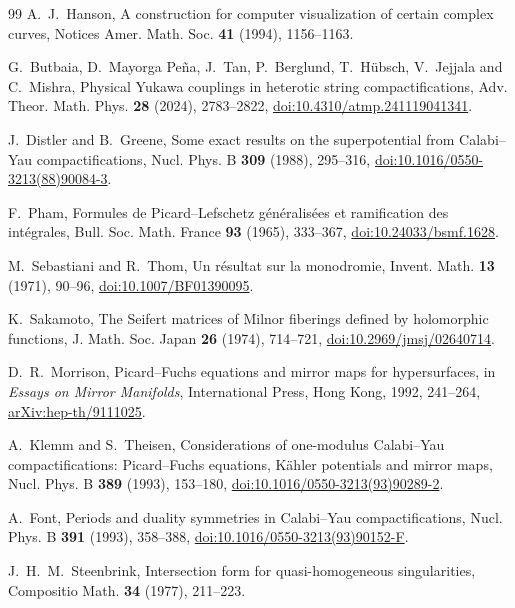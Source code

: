 \begin{thebibliography}{99}
A.~J.~Hanson, A construction for computer visualization of certain complex
curves, Notices Amer. Math. Soc. \textbf{41} (1994), 1156--1163.

G.~Butbaia, D.~Mayorga Pe\~na, J.~Tan, P.~Berglund, T.~H\"ubsch, V.~Jejjala
and C.~Mishra, Physical Yukawa couplings in heterotic string
compactifications, Adv. Theor. Math. Phys. \textbf{28} (2024), 2783--2822,
\href{https://doi.org/10.4310/atmp.241119041341}{doi:10.4310/atmp.241119041341}.

J.~Distler and B.~Greene, Some exact results on the superpotential from
Calabi--Yau compactifications, Nucl. Phys. B \textbf{309} (1988), 295--316,
\href{https://doi.org/10.1016/0550-3213(88)90084-3}{doi:10.1016/0550-3213(88)90084-3}.

F.~Pham, Formules de Picard--Lefschetz g\'en\'eralis\'ees et ramification
des int\'egrales, Bull. Soc. Math. France \textbf{93} (1965), 333--367,
\href{https://doi.org/10.24033/bsmf.1628}{doi:10.24033/bsmf.1628}.

M.~Sebastiani and R.~Thom, Un r\'esultat sur la monodromie, Invent. Math.
\textbf{13} (1971), 90--96,
\href{https://doi.org/10.1007/BF01390095}{doi:10.1007/BF01390095}.

K.~Sakamoto, The Seifert matrices of Milnor fiberings defined by holomorphic
functions, J. Math. Soc. Japan \textbf{26} (1974), 714--721,
\href{https://doi.org/10.2969/jmsj/02640714}{doi:10.2969/jmsj/02640714}.

D.~R.~Morrison, Picard--Fuchs equations and mirror maps for hypersurfaces,
in \emph{Essays on Mirror Manifolds}, International Press, Hong Kong, 1992,
241--264, \href{https://arxiv.org/abs/hep-th/9111025}{arXiv:hep-th/9111025}.

A.~Klemm and S.~Theisen, Considerations of one-modulus Calabi--Yau
compactifications: Picard--Fuchs equations, K\"ahler potentials and mirror
maps, Nucl. Phys. B \textbf{389} (1993), 153--180,
\href{https://doi.org/10.1016/0550-3213(93)90289-2}{doi:10.1016/0550-3213(93)90289-2}.

A.~Font, Periods and duality symmetries in Calabi--Yau compactifications,
Nucl. Phys. B \textbf{391} (1993), 358--388,
\href{https://doi.org/10.1016/0550-3213(93)90152-F}{doi:10.1016/0550-3213(93)90152-F}.

J.~H.~M.~Steenbrink, Intersection form for quasi-homogeneous singularities,
Compositio Math. \textbf{34} (1977), 211--223.


\end{thebibliography}
